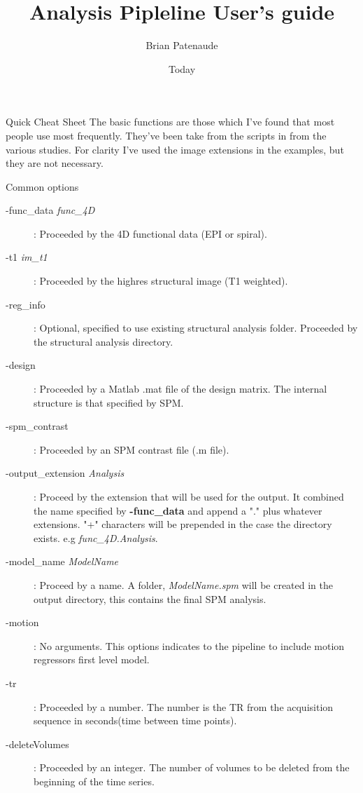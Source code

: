 \documentclass[]{article}
\begin{document}
\title{Analysis Pipleline User's guide}
\author{Brian Patenaude}
\date{Today}
\maketitle

\begin{section}{Quick Cheat Sheet}
The basic functions are those which I've found that most people use most frequently. They've been take from the scripts in from the various studies. For clarity I've used the image extensions in the examples, but they are not necessary.
\begin{subsection}{Common options}
\begin{description}
	\item [-func\_data {\it func\_4D}] :  Proceeded by the 4D functional data (EPI or spiral).
	\item [ -t1 {\it im_t1}]  : Proceeded by the highres structural image (T1 weighted). 
	\item [-reg\_info] : Optional, specified to use existing structural analysis folder. Proceeded by the structural analysis directory.
	\item [-design] : Proceeded by a Matlab .mat file of the design matrix. The internal structure is that specified by SPM.
	\item [-spm\_contrast] : Proceeded by an SPM contrast file (.m file).
	\item [-output\_extension {\it Analysis}] : Proceed by the extension that will be used for the output. It combined the name specified by 
						\hspace*{1cm} {\bf -func\_data} and append a "." plus whatever extensions. "+"  characters will be prepended in the case the directory 
						\hspace*{1cm}exists. e.g {\it func\_4D.Analysis}.
	\item[-model\_name {\it ModelName}] : Proceed by a name. A folder, {\it ModelName.spm} will be created in the output directory, this contains the final SPM analysis.
	\item[-motion] : No arguments. This options indicates to the pipeline to include motion regressors first level model.
	\item[-tr] : Proceeded by a number. The number is the TR from the acquisition sequence in seconds(time between time points).
	\item[-deleteVolumes] : Proceeded by an integer. The number of volumes to be deleted from the beginning of the time series.

\end{description}
\end{subsection}
\end{section}
\end{document}
